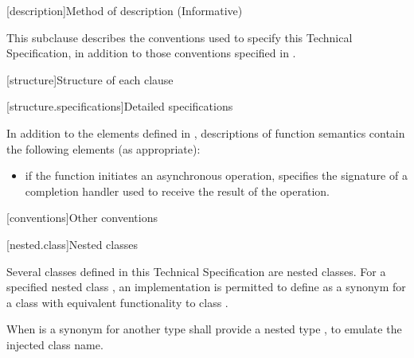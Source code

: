 
[description]{Method of description (Informative)}

\pnum
 This subclause describes the conventions used to specify this Technical Specification, in addition to those conventions specified in .


[structure]{Structure of each clause}


[structure.specifications]{Detailed specifications}

\pnum
In addition to the elements defined in , descriptions of function semantics contain the following elements (as appropriate):

\begin{itemize}
\item
\completionsig if the function initiates an asynchronous operation, specifies the signature of a completion handler used to receive the result of the operation.
\end{itemize}




[conventions]{Other conventions}


[nested.class]{Nested classes}

\pnum
Several classes defined in this Technical Specification are nested classes.
For a specified nested class , an implementation is permitted to
define  as a synonym for a class with equivalent functionality to
class . \begin{note} When  is a synonym for another
type  shall provide a nested type , to emulate the injected
class name. \end{note}


